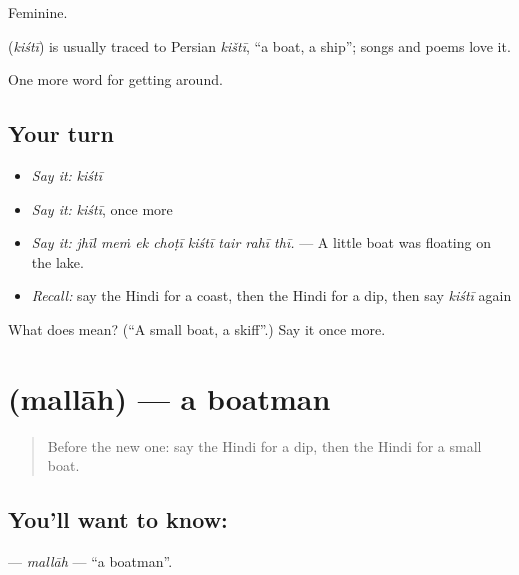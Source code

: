 Feminine.

\begin{cousinweb}
\textbf{} (\emph{kiśtī}) is usually traced to Persian \emph{kištī}, \textquotedblleft{}a boat, a ship\textquotedblright{}; songs and poems love it.
\end{cousinweb}

\begin{grammarlens}[title={What you've built}]
One more word for getting around.
\end{grammarlens}

\subsection*{Your turn}
\begin{itemize}
\raggedright
  \item \emph{Say it:} \emph{kiśtī}
  \item \emph{Say it:} \emph{kiśtī}, once more
  \item \emph{Say it:} \emph{jhīl meṁ ek choṭī kiśtī tair rahī thī.} — A little boat was floating on the lake.
  \item \emph{Recall:} say the Hindi for a coast, then the Hindi for a dip, then say \emph{kiśtī} again
\end{itemize}

\begin{tcolorbox}[breakable,colback=teal!4,colframe=teal!35!black,title={Before you move on}]
What does  mean? (\textquotedblleft{}A small boat, a skiff\textquotedblright{}.) Say it once more.
\end{tcolorbox}
\section[\texorpdfstring{\hi{मल्लाह} (mallāh)}{मल्लाह (mallāh)}]{ (mallāh) — a boatman}

\label{lesson:HI-C445-mallah}



\begin{quote}
Before the new one: say the Hindi for a dip, then the Hindi for a small boat.
\end{quote}

\subsection*{You'll want to know: }
\textbf{} — \emph{mallāh} — \textquotedblleft{}a boatman\textquotedblright{}.

